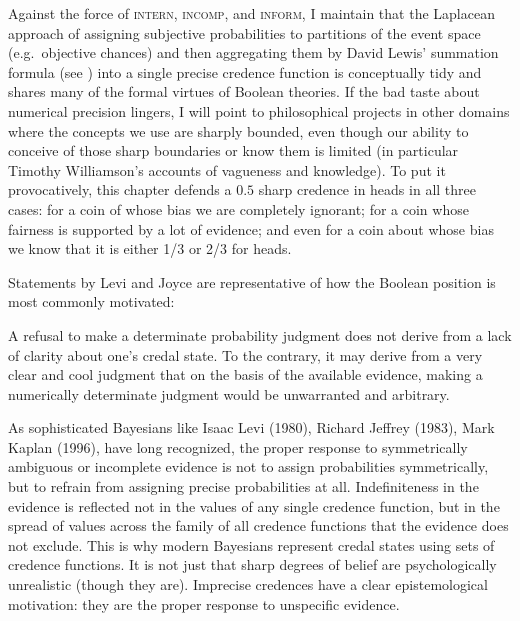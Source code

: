 \documentclass[phd,12pt,oneside]{ubcthesis}
\begin{document}

Against the force of \textsc{intern}, \textsc{incomp}, and
\textsc{inform}, I maintain that the Laplacean approach of assigning
subjective probabilities to partitions of the event space (e.g.\
objective chances) and then aggregating them by David Lewis' summation
formula (see \scite{8}{lewis81}{266f}) into a single precise credence
function is conceptually tidy and shares many of the formal virtues of
Boolean theories. If the bad taste about numerical precision lingers,
I will point to philosophical projects in other domains where the
concepts we use are sharply bounded, even though our ability to
conceive of those sharp boundaries or know them is limited (in
particular Timothy Williamson's accounts of vagueness and knowledge).
To put it provocatively, this chapter defends a $0.5$ sharp credence in
heads in all three cases: for a coin of whose bias we are completely
ignorant; for a coin whose fairness is supported by a lot of evidence;
and even for a coin about whose bias we know that it is either 1/3 or
2/3 for heads.

Statements by Levi and Joyce are representative of how the Boolean
position is most commonly motivated:

\begin{quotex}
  A refusal to make a determinate probability judgment does not derive
  from a lack of clarity about one's credal state. To the contrary, it
  may derive from a very clear and cool judgment that on the basis of
  the available evidence, making a numerically determinate judgment
  would be unwarranted and arbitrary. \scite{3}{levi85}{395}
\end{quotex}

\begin{quotex}
  As sophisticated Bayesians like Isaac Levi (1980), Richard Jeffrey
  (1983), Mark Kaplan (1996), have long recognized, the proper
  response to symmetrically ambiguous or incomplete evidence is not to
  assign probabilities symmetrically, but to refrain from assigning
  precise probabilities at all. Indefiniteness in the evidence is
  reflected not in the values of any single credence function, but in
  the spread of values across the family of all credence functions
  that the evidence does not exclude. This is why modern Bayesians
  represent credal states using sets of credence functions. It is not
  just that sharp degrees of belief are psychologically unrealistic
  (though they are). Imprecise credences have a clear epistemological
  motivation: they are the proper response to unspecific evidence.
  \scite{3}{joyce05}{170f}
\end{quotex}
\end{document}
